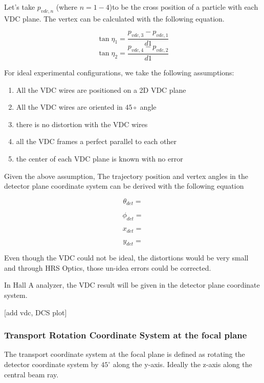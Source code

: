Let's take $p_{vdc,n}$ (where ${n=1-4}$)to be the cross position of a particle with each VDC plane. The vertex can be calculated with the following equation. 

\begin{equation}
    \tan \eta_{1} = \frac{p_{vdc,3} - p_{vdc, 1}}{d1}    
\end{equation}
\begin{equation}
    \tan \eta_{2} = \frac{p_{vdc,4} - p_{vdc, 2}}{d1}    
\end{equation}

For ideal experimental configurations, we take the following assumptions:
\begin{enumerate}
    \item All the VDC wires are positioned on a 2D VDC plane
    \item All the VDC wires are oriented in $45\circ$ angle
    \item there is no distortion with the VDC wires
    \item all the VDC frames a perfect parallel to each other 
    \item the center of each VDC plane is known with no error
\end{enumerate}

Given the above assumption, The trajectory position and vertex angles in the detector plane coordinate system can be derived with the following equation 

\begin{equation}
    \theta_{det} = 
\end{equation}
    
\begin{equation}
    \phi_{det} = 
\end{equation}

\begin{equation}
    x_{det} =
\end{equation}

\begin{equation}
    y_{det} =
\end{equation}

Even though the VDC could not be ideal, the distortions would be very small and through HRS Optics, those un-idea errors could be corrected. 

In Hall A analyzer, the VDC result will be given in the detector plane coordinate system.

[add vdc, DCS plot]

\subsubsection{Transport Rotation Coordinate System at the focal plane}
The transport coordinate system at the focal plane is defined as rotating the detector coordinate system by $45^{\circ}$ along the y-axis. Ideally the z-axis along the central beam ray. 

